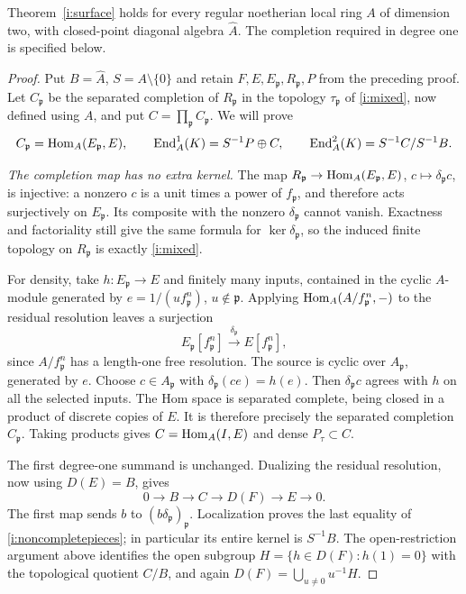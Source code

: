 \begin{theorem}\label{i:noncomplete}
Theorem~\ref{i:surface} holds for every regular noetherian local ring
$A$ of dimension two, with closed-point diagonal algebra $\widehat A$.
The completion required in degree one is specified below.
\end{theorem}
\begin{proof}
Put $B=\widehat A$, $S=A\setminus\{0\}$ and retain
$F,E,E_{\mathfrak p},R_{\mathfrak p},P$ from the preceding proof.
Let $C_{\mathfrak p}$ be the separated completion of
$R_{\mathfrak p}$ in the topology $\tau_{\mathfrak p}$ of
\eqref{i:mixed}, now defined using $A$, and put
$C=\prod_{\mathfrak p}C_{\mathfrak p}$. We will prove
\begin{equation}\label{i:noncompletepieces}
 C_{\mathfrak p}=\operatorname{Hom}_A(E_{\mathfrak p},E),\qquad
 \operatorname{End}_A^1(K)=S^{-1}P\oplus C,\qquad
 \operatorname{End}_A^2(K)=S^{-1}C/S^{-1}B.
\end{equation}

\emph{The completion map has no extra kernel.}
The map $R_{\mathfrak p}\to\operatorname{Hom}_A(E_{\mathfrak p},E)$,
$c\mapsto\delta_{\mathfrak p}c$, is injective: a nonzero $c$ is
a unit times a power of $f_{\mathfrak p}$, and therefore acts
surjectively on $E_{\mathfrak p}$. Its composite with the nonzero
$\delta_{\mathfrak p}$ cannot vanish. Exactness and factoriality
still give the same formula for $\ker\delta_{\mathfrak p}$,
so the induced finite topology on $R_{\mathfrak p}$ is exactly
\eqref{i:mixed}.

For density, take $h:E_{\mathfrak p}\to E$ and finitely many
inputs, contained in the cyclic $A$-module generated by
$e=1/(u f_{\mathfrak p}^n)$, $u\notin\mathfrak p$.
Applying $\operatorname{Hom}_A(A/f_{\mathfrak p}^n,-)$ to the residual resolution
leaves a surjection
\[
 E_{\mathfrak p}[f_{\mathfrak p}^n]
 \xrightarrow{\delta_{\mathfrak p}} E[f_{\mathfrak p}^n],
\]
since $A/f_{\mathfrak p}^n$ has a length-one free resolution.
The source is cyclic over $A_{\mathfrak p}$, generated by $e$.
Choose $c\in A_{\mathfrak p}$ with
$\delta_{\mathfrak p}(ce)=h(e)$. Then
$\delta_{\mathfrak p}c$ agrees with $h$ on all the selected
inputs. The Hom space is separated complete, being closed in a
product of discrete copies of $E$. It is therefore precisely the
separated completion $C_{\mathfrak p}$. Taking products gives
$C=\operatorname{Hom}_A(I,E)$ and dense $P_\tau\subset C$.

The first degree-one summand is unchanged. Dualizing the residual
resolution, now using $D(E)=B$, gives
\[
 0\longrightarrow B\longrightarrow C\longrightarrow D(F)
 \longrightarrow E\longrightarrow0.
\]
The first map sends $b$ to $(b\delta_{\mathfrak p})_{\mathfrak p}$.
Localization proves the last equality of \eqref{i:noncompletepieces};
in particular its entire kernel is $S^{-1}B$. The open-restriction
argument above identifies the open subgroup
$H=\{h\in D(F):h(1)=0\}$ with the topological quotient $C/B$,
and again $D(F)=\bigcup_{u\ne0}u^{-1}H$.


\end{proof}

